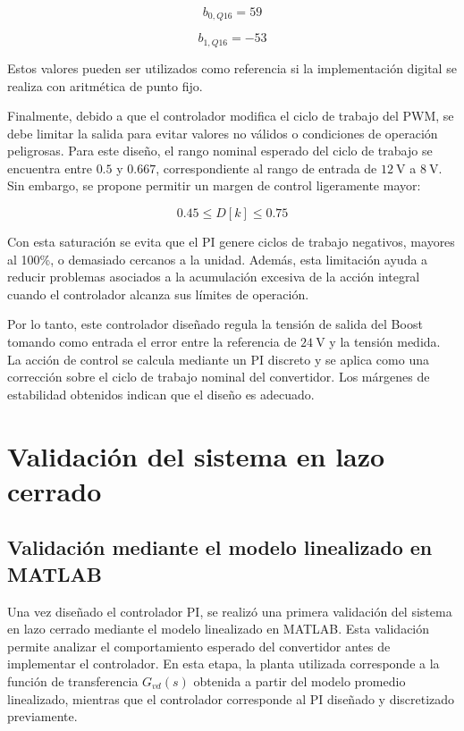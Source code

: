 \documentclass[conference]{IEEEtran}
\begin{document}
\begin{equation}
    b_{0,Q16}=59
\end{equation}

\begin{equation}
    b_{1,Q16}=-53
\end{equation}

Estos valores pueden ser utilizados como referencia si la implementación digital se realiza con aritmética de punto fijo.

Finalmente, debido a que el controlador modifica el ciclo de trabajo del PWM, se debe limitar la salida para evitar valores no válidos o condiciones de operación peligrosas. Para este diseño, el rango nominal esperado del ciclo de trabajo se encuentra entre $0.5$ y $0.667$, correspondiente al rango de entrada de $12~\mathrm{V}$ a $8~\mathrm{V}$. Sin embargo, se propone permitir un margen de control ligeramente mayor:

\begin{equation}
    0.45 \leq D[k] \leq 0.75
\end{equation}

Con esta saturación se evita que el PI genere ciclos de trabajo negativos,
mayores al 100\%, o demasiado cercanos a la unidad. Además, esta limitación ayuda a reducir problemas asociados a la acumulación excesiva de la acción integral cuando el controlador alcanza sus límites de operación.

Por lo tanto, este controlador diseñado regula la tensión de salida del Boost tomando como entrada el error entre la referencia de $24~\mathrm{V}$ y la tensión medida. La acción de control se calcula mediante un PI discreto y se aplica como una corrección sobre el ciclo de trabajo nominal del convertidor. Los márgenes de estabilidad obtenidos indican que el diseño es adecuado.






\section{Validación del sistema en lazo cerrado}

\subsection{Validación mediante el modelo linealizado en MATLAB}

Una vez diseñado el controlador PI, se realizó una primera validación del sistema en lazo cerrado mediante el modelo linealizado en MATLAB. Esta validación permite analizar el comportamiento esperado del convertidor antes de implementar el controlador. En esta etapa, la planta utilizada corresponde a la función de transferencia $G_{vd}(s)$ obtenida a partir del modelo promedio linealizado, mientras que el controlador corresponde al PI diseñado y discretizado previamente.
\end{document}
